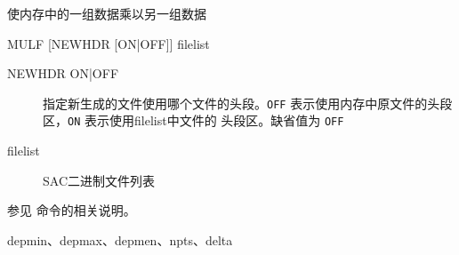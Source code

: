 \label{cmd:mulf}

使内存中的一组数据乘以另一组数据

\begin{SACSTX}
MULF [NEWHDR [ON|OFF]] filelist
\end{SACSTX}

\begin{description}
\item [NEWHDR ON|OFF] 指定新生成的文件使用哪个文件的头段。\texttt{OFF}
    表示使用内存中原文件的头段区，\texttt{ON} 表示使用filelist中文件的
    头段区。缺省值为 \texttt{OFF}
\item [filelist] SAC二进制文件列表
\end{description}

参见  命令的相关说明。

depmin、depmax、depmen、npts、delta
